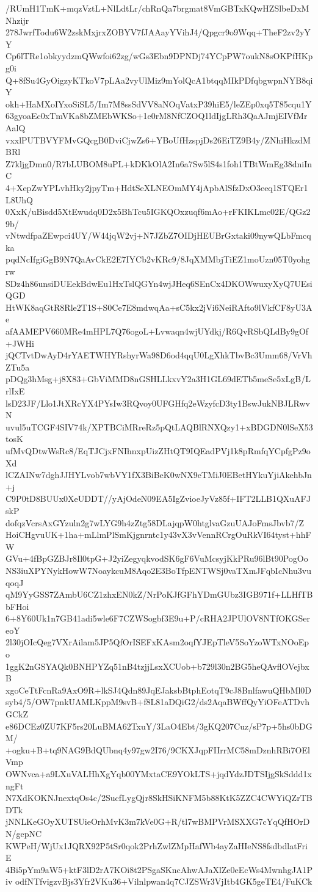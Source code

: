 /RUmH1TmK+mqzVztL+NlLdtLr/chRnQa7brgmat8VmGBTxKQwHZSlbeDxMNhzijr
278JwrfTodu6W2zskMxjrxZOBYV7fJAAayYVihJ4/Qpgcr9o9Wqq+TheF2zv2yYY
Cp6lTRe1obkyydzmQWwfoi62zg/wGs3Ebn9DPNDj74YCpPW7oukN8sOKPfHKpg0i
Q+8fSu4GyOigzyKTkoV7pLAa2vyUlMiz9mYolQcA1btqqMIkPDfqbgwpnNYB8qiY
okh+HaMXoIYxoSiSL5/Im7M8ssSdVV8aNOqVatxP39hiE5/leZEp0xq5T85cqu1Y
63gyoaEc0xTmVKa8bZMEbWKSo+1e0rM8NfCZOQ1ldIjgLRh3QaAJmjEIVfMrAalQ
vxxlPUTBVYFMvGQcgB0DviCjwZs6+YBoUfHzspjDs26EiTZ9B4y/ZNhiHkzdMBRl
Z7kljgDmn0/R7bLUBOM8uPL+kDKkOlA2In6a7Sw5lS4s1foh1TBtWmEg38dniInC
4+XepZwYPLvhHky2jpyTm+HdtSeXLNEOmMY4jApbAlSfzDxO3eeq1STQEr1L8UhQ
0XxK/uBisdd5XtEwudq0D2x5BhTcu5IGKQOxzuqf6mAo+rFKIKLmc02E/QGz29b/
vNtwdfpaZEwpci4UY/W44jqW2vj+N7JZbZ7OIDjHEUBrGxtaki09nywQLbFmcqka
pqdNcIfgiGgB9N7QaAvCkE2E7IYCb2vKRc9/8JqXMMbjTiEZ1moUzn05T0yohgrw
SDz4h86unsiDUEekBdwEu1HxTslQGYn4wjJHeq6SEnCx4DKOWwuxyXyQ7UEsiQGD
HtWK8aqGtR8Rle2T1S+S0Ce7E8mdwqAa+sC5kx2jVi6NeiRAfto9lVkfCF8yU3Ae
afAAMEPV660MRe4mHPL7Q76ogoL+Lvwaqn4wjUYdkj/R6QvRSbQLdBy9gOf+JWHi
jQCTvtDwAyD4rYAETWHYRshyrWa98D6od4qqU0LgXhkTbvBc3Umm68/VrVhZTu5a
pDQg3hMsg+j8X83+GbViMMD8nGSHLLkxvY2a3H1GL69dETb5meSe5xLgB/LrlIxE
lsD23JF/Llo1JtXRcYX4PYsIw3RQvoy0UFGHfq2eWzyfcD3ty1BswJukNBJLRwvN
uvul5uTCGF4SIV74k/XPTBCiMRreRz5pQtLAQBlRNXQzy1+xBDGDN0lSeX53tosK
ufMvQDtwWsRc8/EqTJCjxFNIhnxpUizZHtQT9IQEadPVj1k8pRmfqYCpfgPz9oXd
lCZAINw7dghJJHYLvob7wbVY1fX3BiBeK0wNX9eTMiJ0EBetHYkuYjiAkehbJn+j
C9P0tD8BUUx0XeUDDT//yAjOdeN09EA5IgZvioeJyVz85f+IFT2LLB1QXuAFJskP
dofqzVcrsAxGYzuln2g7wLYG9h4zZtg58DLajqpW0htglvaGzuUAJoFmsJbvb7/Z
HoiCHgvuUK+1ha+mLlmPlSmKjgnrntc1y43vX3vVennRCrgOuRkVI64tyst+hhFW
GVu+4fBpGZBJr8Il0tpG+J2yiZegyqkvodSK6gF6VuMcsyjKkPRu96lBt90PogOo
NS3iuXPYNykHowW7NoaykcuM8Aqo2E3BoTfpENTWSj0vaTXmJFqbIcNhu3vuqoqJ
qM9YyGSS7ZAmbU6CZ1zhxEN0kZ/NrPoKJfGFhYDmGUbz3IGB971f+LLHfTBbFHoi
6+8Y60Uk1n7GB41adi5wle6F7CZWSogbf3E9u+P/cRHA2JPUlOV8NTfOKGSereoY
2l30jOIcQeg7VXrAilam5JP5QfOrISEFxKAsm2oqfYJEpTleV5SoYzoWTxNOoEpo
1ggK2nGSYAQk0BNHPYZq51nB4tzjjLsxXCUob+b729l30n2BG5heQAvflOVejbxB
xgoCeTtFcnRa9AxO9R+lkSJ4Qdn89JqEJaksbBtphEotqT9cJ8BnlfawuQHbMl0D
syb4/5/OW7pnkUAMLKppM9svB+f8L81aDQiG2/ds2AqaBWffQyYiOFeATDvhGCkZ
e86DCEz0ZU7KF5rs20LuBMA62TxuY/3LaO4Ebt/3gKQ207Cuz/sP7p+5hs0bDGM/
+ogku+B+tq9NAG9BdQUbnq4y97gw2I76/9CKXJqpFIIrrMC58mDznhRBi7OElVmp
OWNvca+a9LXuVALHhXgYqb00YMxtaCE9YOkLTS+jqdYdzJDTSIjgSkSddd1xngFt
N7XdKOKNJnextqOs4c/2SucfLygQjr8SkHSiKNFM5b88KtK5ZZC4CWYiQZrTBDTk
jNNLKeGOyXUTSUieOrhMvK3m7kVe0G+R/tl7wBMPVrMSXXG7cYqQfHOrDN/gepNC
KWPeH/WjUx1JQRX92P5tSr0qok2PrhZwlZMpHafWb4ayZaHIeNS8fsdbdlatFriE
4Bi5pYm9aW5+ktF3lD2rA7KOi8t2PSgaSKncAhwAJaXlZe0eEcWs4MwnhgJA1Piv
odfNTfvigzvBjs3Yfr2VKu36+Vilnlpwan4q7CJZSWr3VjItb4GK5geTE4/FuKCk
